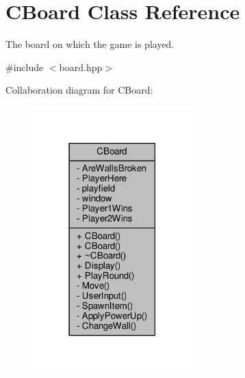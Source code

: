 \hypertarget{class_c_board}{\section{C\-Board Class Reference}
\label{class_c_board}
}


The board on which the game is played.  




{\ttfamily \#include $<$board.\-hpp$>$}



Collaboration diagram for C\-Board\-:
\nopagebreak
\begin{figure}[H]
\begin{center}
\leavevmode
\includegraphics[width=174pt]{class_c_board__coll__graph}
\end{center}
\end{figure}
